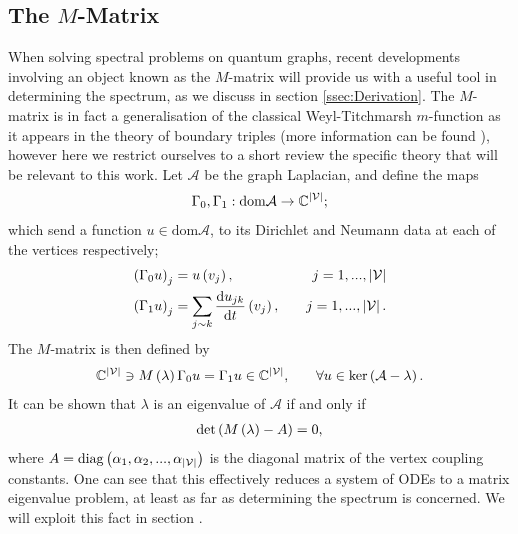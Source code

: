 \subsection{The $M$-Matrix} \label{ssec:MMatrix}
When solving spectral problems on quantum graphs, recent developments involving an object known as the $M$-matrix will provide us with a useful tool in determining the spectrum, as we discuss in section \ref{ssec:Derivation}.
The $M$-matrix is in fact a generalisation of the classical Weyl-Titchmarsh $m$-function as it appears in the theory of boundary triples (more information can be found ), however here we restrict ourselves to a short review the specific theory that will be relevant to this work.
Let $\mathcal{A}$ be the graph Laplacian, and define the maps
\begin{align*}
	\Gamma_0, \Gamma_1: \mathrm{dom}\mathcal{A} \rightarrow \mathbb{C}^{\left\lvert \mathcal{V} \right\rvert};
\end{align*}
which send a function $u\in\mathrm{dom}\mathcal{A}$, to its Dirichlet and Neumann data at each of the vertices respectively;
\begin{align*}
	\left( \Gamma_0 u \right)_j &= u\left( v_j \right), \quad &j=1,...,\left\lvert \mathcal{V} \right\rvert \\
	\left( \Gamma_1 u \right)_j &= \sum_{j\sim k}\dfrac{\mathrm{d}u_{jk}}{\mathrm{d}t}\left( v_j \right), \quad &j=1,...,\left\lvert \mathcal{V} \right\rvert. 
\end{align*}
The $M$-matrix is then defined by
\begin{align*}
	\mathbb{C}^{\left\lvert \mathcal{V} \right\rvert} \ni M\left( \lambda \right)\Gamma_0 u &= \Gamma_1 u \in \mathbb{C}^{\left\lvert \mathcal{V} \right\rvert},
	 &\quad \forall u\in\mathrm{ker}\left( \mathcal{A}-\lambda \right).
\end{align*}
It can be shown that $\lambda$ is an eigenvalue of $\mathcal{A}$ if and only if
\begin{align*}
	\mathrm{det}\left( M\left( \lambda \right) - A \right)= 0,
\end{align*}
where $A = \mathrm{diag}\left( \alpha_1, \alpha_2, ... , \alpha_{\left\lvert \mathcal{V} \right\rvert} \right)$ is the diagonal matrix of the vertex coupling constants.
One can see that this effectively reduces a system of ODEs to a matrix eigenvalue problem, at least as far as determining the spectrum is concerned.
We will exploit this fact in section .
